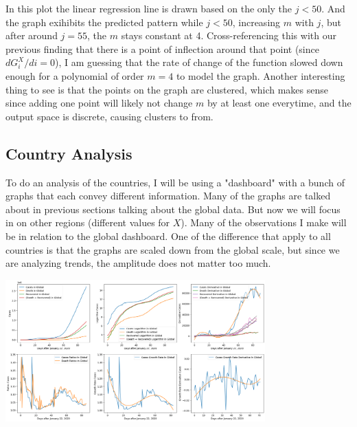 \documentclass{report}
\begin{document}
                In this plot the linear regression line is drawn based on the only the $j < 50$. And the graph exihibits the predicted pattern while $j < 50$, increasing $m$ with $j$, but after around $j = 55$, the $m$ stays constant at 4. Cross-referencing this with our previous finding that there is a point of inflection around that point (since $dG^X_i/di = 0$), I am guessing that the rate of change of the function slowed down enough for a polynomial of order $m = 4$ to model the graph.
                \newline\indent
                Another interesting thing to see is that the points on the graph are clustered, which makes sense since adding one point will likely not change $m$ by at least one everytime, and the output space is discrete, causing clusters to from. 
        \subsection{Country Analysis}
        \label{sec:country}
            To do an analysis of the countries, I will be using a "dashboard" with a bunch of graphs that each convey different information. Many of the graphs are talked about in previous sections talking about the global data. But now we will focus in on other regions (different values for $X$).
            \newline\indent
            Many of the observations I make will be in relation to the global dashboard. One of the difference that apply to all countries is that the graphs are scaled down from the global scale, but since we are analyzing trends, the amplitude does not matter too much.
            \begin{center}
                \includegraphics[width=10cm]{plots/global/analyze.png}
            \end{center}
\end{document}

